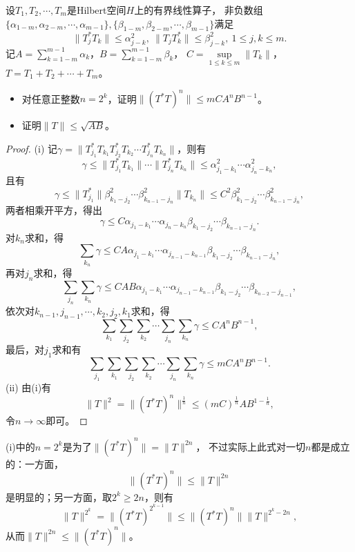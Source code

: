 \begin{10}
    设$T_1,T_2,\cdots,T_m$是Hilbert空间$H$上的有界线性算子，
    非负数组$\{\alpha_{1-m},\alpha_{2-m},\cdots,\alpha_{m-1}\},\{\beta_{1-m},\beta_{2-m},\cdots,\beta_{m-1}\}$满足
    \[\|T_j^*T_k\|\leqslant\alpha_{j-k}^2,\ \|T_jT_k^*\|\leqslant\beta_{j-k}^2,\ 1 \leqslant j,k \leqslant m.\]
    记$\displaystyle A=\sum_{k=1-m}^{m-1}\alpha_k$，$\displaystyle B=\sum_{k=1-m}^{m-1}\beta_k$，
    $C=\sup\limits_{1 \leqslant k \leqslant m}\|T_k\|$，$T=T_1+T_2+\cdots+T_m$。
    \begin{itemize}
    \item[(i)] 对任意正整数$n=2^k$，证明$\|(T^*T)^n\| \leqslant mCA^nB^{n-1}$。
    \item[(ii)] 证明$\|T\|\leqslant\sqrt{AB}$。
    \end{itemize}
\end{10}
\begin{proof}
    (i) 记$\gamma=\|T^*_{j_1}T_{k_1}T^*_{j_2}T_{k_2}\cdots T^*_{j_n}T_{k_n}\|$，则有
    \[\gamma\leqslant\|T^*_{j_1}T_{k_1}\|\cdots\|T^*_{j_n}T_{k_n}\|\leqslant\alpha^2_{j_1-k_1}\cdots\alpha^2_{j_n-k_n},\]
    且有
    \[\gamma\leqslant\|T^*_{j_1}\|\beta^2_{k_1-j_2}\cdots\beta^2_{k_{n-1}-j_n}\|T_{k_n}\|
    \leqslant C^2\beta^2_{k_1-j_2}\cdots\beta^2_{k_{n-1}-j_n},\]
    两者相乘开平方，得出
    \[\gamma\leqslant C\alpha_{j_1-k_1}\cdots\alpha_{j_n-k_n}\beta_{k_1-j_2}\cdots\beta_{k_{n-1}-j_n}.\]
    对$k_n$求和，得
    \[\sum_{k_n}\gamma\leqslant CA\alpha_{j_1-k_1}\cdots\alpha_{j_{n-1}-k_{n-1}}\beta_{k_1-j_2}\cdots\beta_{k_{n-1}-j_n},\]
    再对$j_n$求和，得
    \[\sum_{j_n}\sum_{k_n}\gamma\leqslant CAB\alpha_{j_1-k_1}\cdots\alpha_{j_{n-1}-k_{n-1}}\beta_{k_1-j_2}\cdots\beta_{k_{n-2}-j_{n-1}},\]
    依次对$k_{n-1},j_{n-1},\cdots,k_2,j_2,k_1$求和，得
    \[\sum_{k_1}\sum_{j_2}\sum_{k_2}\cdots\sum_{j_n}\sum_{k_n}\gamma\leqslant CA^nB^{n-1},\]
    最后，对$j_1$求和有
    \[\sum_{j_1}\sum_{k_1}\sum_{j_2}\sum_{k_2}\cdots\sum_{j_n}\sum_{k_n}\gamma\leqslant mCA^nB^{n-1}.\]
    (ii) 由(i)有
    \[\|T\|^2=\|(T^*T)^n\|^\frac{1}{n}\leqslant(mC)^\frac{1}{n}AB^{1-\frac{1}{n}},\]
    令$n\to\infty$即可。
\end{proof}
\begin{remark*}
    (i)中的$n=2^k$是为了$\|(T^*T)^n\|=\|T\|^{2n}$，
    不过实际上此式对一切$n$都是成立的：一方面，
    \[\|(T^*T)^n\|\leqslant\|T\|^{2n}\]
    是明显的；另一方面，取$2^k\geqslant2n$，则有
    \[\|T\|^{2^k}=\|(T^*T)^{2^{k-1}}\|\leqslant\|(T^*T)^n\|\|T\|^{2^k-2n},\]
    从而$\|T\|^{2n}\leqslant\|(T^*T)^n\|$。
\end{remark*}

